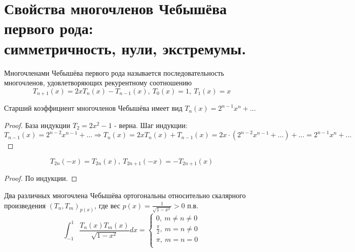 \section[Свойства многочленов Чебышёва первого рода: симметричность, нули, экстремумы.]{Свойства многочленов Чебышёва первого
  рода: \\ симметричность, нули, экстремумы.}

\begin{definition}
  Многочленами Чебышёва первого рода называется последовательность
  многочленов, удовлетворяющих рекурентному соотношению
  \[T_{n+1}(x)=2xT_n(x)-T_{n-1}(x),\ T_0(x)=1,\ T_1(x)=x\]
\end{definition}

\begin{theorem}
  Старший коэффициент многочленов Чебышёва имеет вид $T_n(x)=2^{n-1}x^n+\ldots$
\end{theorem}

\begin{proof}
  База индукции $T_2=2x^2-1$ - верна. Шаг индукции:
  \[T_{n-1}(x)=2^{n-2}x^{n-1}+\ldots\Rightarrow T_n(x)=2xT_n(x)+T_{n-1}(x)=2x\cdot(2^{n-2}x^{n-1}+\ldots)+\ldots=2^{n-1}x^n+\ldots\]
\end{proof}

\begin{theorem}
  \[T_{2n}(-x)=T_{2n}(x),\ T_{2n+1}(-x)=-T_{2n+1}(x)\]
\end{theorem}

\begin{proof}
  По индукции.
\end{proof}

\begin{theorem}
  Два различных многочлена Чебышёва ортогональны относительно
  скалярного произведения $(T_n,T_m)_{p(x)}$, где вес $p(x)=\frac{1}{\sqrt{1-x^2}} > 0$ п.в.
  \[\int_{-1}^{1}\frac{T_n(x)T_m(x)}{\sqrt{1-x^2}}dx=\begin{cases}
      0,\ m\neq n\neq0         \\
      \frac{\pi}{2},\ m=n\neq0 \\
      \pi,\ m=n=0              \\
    \end{cases}\]
\end{theorem}


